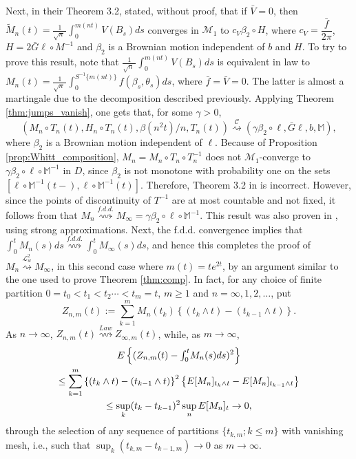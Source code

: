 \documentclass[final]{amsart}
\theoremstyle{definition}
\numberwithin{equation}{section}
\def\disp{\displaystyle}
\newcommand{\dM}{\ensuremath{\mathbb{M}}}
\newcommand{\cL}{\ensuremath{\mathcal{L}}}
\newcommand{\cM}{\ensuremath{\mathcal{M}}}
\def\sn{\sqrt{n}\; }
\begin{document}
Next, in their Theorem 3.2,  \citet{Kasahara/Kotani:1979} stated, without proof, that if $\bar V=0$,
then $\tilde M_n(t) = \frac{1}{\sn}\int_0^{m(nt)}V(B_s)ds$ converges in  $\cM_1$ to $c_V \beta_2\circ H$, where $c_V=\dfrac{\bar f}{2\pi}$,
$H = 2 \bar G \ell \circ M^{-1}$ and $\beta_2$ is a Brownian motion independent of $b$ and $H$. To try to prove this result, note that
$\frac{1}{\sn}\int_0^{m(nt)}V(B_s)ds$ is equivalent in law to
$\disp M_n(t) = \frac{1}{\sn}\int_0^{S^{-1}\{m(nt)\}} f(\beta_s,\theta_s) ds$,
where $\bar f = \bar V=0$. The latter is almost a martingale due to the decomposition described previously.
Applying Theorem \ref{thm:jumps_vanish}, one gets that, for some $\gamma>0$,
$$
\left(M_n\circ T_n(t), H_n\circ T_n(t), \beta(n^2t)/n,T_n(t)\right)
\stackrel{\mathcal{C}}{\rightsquigarrow}\left(\gamma\beta_2\circ \ell, \bar G \ell, b,\dM\right),
$$
where $\beta_2$ is a Brownian motion independent of $\ell$. Because of Proposition \ref{prop:Whitt_composition},
$M_n = M_n\circ T_n\circ T_n^{-1}$ does not $\cM_1$-converge to $\gamma\beta_2\circ \ell\circ \dM^{-1}$ in $D$,
since $\beta_2$ is not monotone with probability one on the sets $[ \ell\circ \dM^{-1}(t-), \ell\circ \dM^{-1}(t)]$. Therefore, Theorem 3.2 in
\citet{Kasahara/Kotani:1979} is incorrect.
However, since the points of discontinuity of $T^{-1}$ are at most countable and not fixed, it follows from
\citet[Theorem 12.4.1]{Whitt:2002} that $M_n \stackrel{f.d.d.}{\rightsquigarrow} M_\infty = \gamma \beta_2\circ \ell\circ \dM^{-1}$.
This result was also proven in \citet{Csaki/Foldes/Hu:2004}, using strong approximations.
Next, the f.d.d. convergence implies that  $\int_0^t M_n(s)ds \stackrel{f.d.d.}{\rightsquigarrow} \int_0^t M_\infty(s)ds$,
and hence this completes the proof of $M_n \stackrel{\cL^2_w}{\rightsquigarrow} M_\infty$,
in this second case where $m(t)=te^{2t}$,
by an argument similar to the one used to prove Theorem \ref{thm:comp}.
In fact, for any choice of finite partition $0=t_0< t_1< t_2 \cdots <t_m=t$, $m\ge1$ and $n=\infty,1,2,\dots$, put
$$
Z_{n,m}(t):= \sum_{k=1}^m M_n(t_k)\left\{(t_k\wedge t)-(t_{k-1}\wedge t)\right\}.
$$
As $n\to\infty$, $Z_{n,m}(t)\stackrel{Law}{\rightsquigarrow}Z_{\infty,m}(t)$, while, as $m\to\infty$,
\begin{multline*}
E\left\{(Z_{n,m}(t) - \hbox{$\int_0^t$} M_n(s)ds)^2\right\} \\
\le \sum_{k=1}^m\left\{(t_k\wedge t)-(t_{k-1}\wedge t)\right\}^2\left\{E[M_n]_{t_k\wedge t}-E[M_n]_{t_{k-1}\wedge t}\right\}\\
\le \sup_k(t_k-t_{k-1})^2\sup_nE[M_n]_t\to0,
\end{multline*}
through the selection of any sequence of partitions $\{t_{k,m};k\le m\}$ with vanishing mesh, i.e.,
such that $\sup_k(t_{k,m}-t_{k-1,m})\to0$ as $m\to\infty$.
\end{document}
